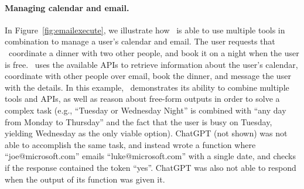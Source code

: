 \paragraph{Managing calendar and email.}
In Figure~\ref{fig:emailexecute}, we illustrate how \DV\ is able to use multiple tools in combination to manage a user's calendar and email. The user requests that \DV\ coordinate a dinner with two other people, and book it on a night when the user is free. \DV\ uses the available APIs to retrieve information about the user's calendar, coordinate with other people over email, book the dinner, and message the user with the details. In this example, \DV\ demonstrates its ability to combine multiple tools and APIs, as well as reason about free-form outputs in order to solve a complex task (e.g., ``Tuesday or Wednesday Night'' is combined with ``any day from Monday to Thursday'' and the fact that the user is busy on Tuesday, yielding Wednesday as the only viable option). ChatGPT (not shown) was not able to accomplish the same task, and instead wrote a function where ``joe@microsoft.com'' emails ``luke@microsoft.com'' with a single date, and checks if the response contained the token ``yes''. ChatGPT was also not able to respond when the output of its function was given it.

